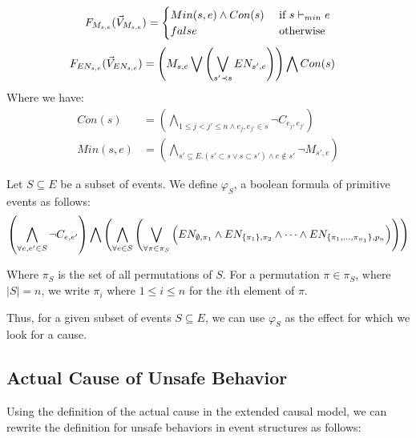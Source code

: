 $$
    F_{M_{s,e}}(\vec V_{M_{s,e}}) = \begin{cases}
        Min(s,e) \wedge Con(s) & \text{ if } s \vdash_{min} e \\
        false                  & \text{ otherwise }
    \end{cases}
$$
\begin{align*}
    F_{EN_{s,e}}(\vec V_{EN_{s,e}}) & =
    \left(
    M_{s,e} \bigvee
    \left(
    \bigvee_{s'\prec s}EN_{s',e}
    \right)
    \right)
    \bigwedge
    Con(s)
\end{align*}
Where we have:
\begin{align*}
    Con(s)   & =   \left(
    \bigwedge_{ 1\leq j<j' \leq n \wedge e_j,e_{j'} \in s}
    \neg C_{e_j,e_{j'}}
    \right)               \\
    Min(s,e) & = \left(
    \bigwedge_{s' \subseteq E. (s' \subset s \vee s \subset s')
        \wedge e \notin s'}
    \neg M_{s',e}
    \right)
\end{align*}

\noindent Let $S \subseteq E$ be a subset of events.
We define $\varphi_S$, a boolean formula of primitive
events as follows:
\begin{align*}
    \left(
        \bigwedge_{\forall e,e' \in S} \neg C_{e,e'}
    \right)
    \bigwedge
    \left(
        \bigwedge_{\forall e \in S}
        \left(
            \bigvee_{\forall \pi \in \pi_S} 
            \left(
                EN_{\emptyset,\pi_1} \wedge
                EN_{\{\pi_1\},\pi_2} \wedge
                \dots
                \wedge
                EN_{\{\pi_1,...,\pi_{n_1}\},p_n}
            \right)
        \right)
    \right)
\end{align*}

Where $\pi_S$ is the set of all permutations of $S$.
For a permutation $\pi \in \pi_S$, where $|S| = n$, 
we write $\pi_i$ where $1 \leq i \leq n$ for the $i$th 
element of $\pi$.

Thus, for a given subset of events $S \subseteq E$, 
we can use $\varphi_S$ as the effect for which we look
for a cause.


\subsection{Actual Cause of Unsafe Behavior}

Using the definition of the actual cause in the extended causal
model, we can rewrite the definition for unsafe behaviors in
event structures as follows:

